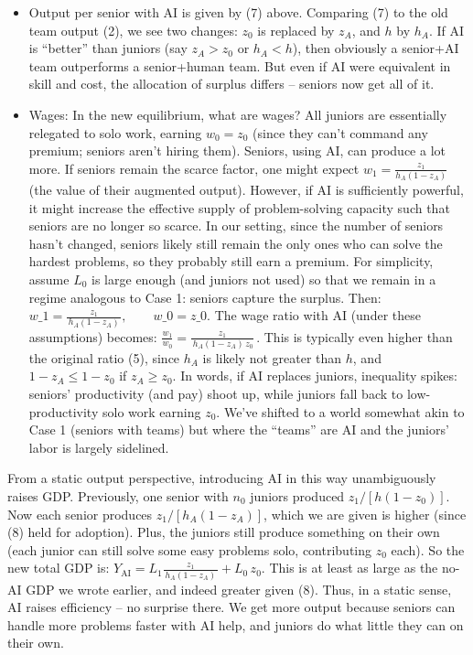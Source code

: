 \documentclass[12pt]{article}
\begin{document}
\begin{itemize}

\item
  {Output per senior with AI} is given by (7) above. Comparing
  (7) to the old team output (2), we see two changes: \(z_0\) is
  replaced by \(z_A\), and \(h\) by \(h_A\). If AI is ``better'' than
  juniors (say \(z_A > z_0\) or \(h_A < h\)), then obviously a senior+AI
  team outperforms a senior+human team. But even if AI were equivalent
  in skill and cost, the {allocation of surplus} differs -- seniors
  now get {all} of it.
\item
  {Wages:} In the new equilibrium, what are wages? All juniors
  are essentially relegated to solo work, earning \(w_0 = z_0\) (since
  they can't command any premium; seniors aren't hiring them). Seniors,
  using AI, can produce a lot more. If seniors remain the scarce factor,
  one might expect \(w_1 = \frac{z_1}{h_A(1-z_A)}\) (the value of their
  augmented output). However, if AI is sufficiently powerful, it might
  increase the {effective supply of problem-solving capacity} such
  that seniors are no longer so scarce. In our setting, since the number
  of seniors hasn't changed, seniors likely still remain the only ones
  who can solve the hardest problems, so they probably still earn a
  premium. For simplicity, assume \(L_0\) is large enough (and juniors
  not used) so that we remain in a regime analogous to Case 1: seniors
  capture the surplus. Then: $ w\_1 = \frac{z_1}{\,h_A(1-z_A)\,},
  \qquad w\_0 = z\_0.$ The {wage ratio with AI} (under these
  assumptions) becomes:
  \(\frac{w_1}{w_0} = \frac{z_1}{\,h_A (1-z_A) \, z_0}\,.\) This is
  typically {even higher} than the original ratio (5), since
  \(h_A\) is likely not greater than \(h\), and \(1-z_A \le 1-z_0\) if
  \(z_A \ge z_0\). In words, if AI replaces juniors, {inequality
  spikes}: seniors' productivity (and pay) shoot up, while juniors fall
  back to low-productivity solo work earning \(z_0\). We've shifted to a
  world somewhat akin to Case 1 (seniors with teams) but where the
  ``teams'' are AI and the juniors' labor is largely sidelined.
\end{itemize}

From a {static output} perspective, introducing AI in this way
unambiguously {raises GDP}. Previously, one senior with \(n_0\)
juniors produced \(z_1/[h(1-z_0)]\). Now each senior produces
\(z_1/[h_A(1-z_A)]\), which we are given is higher (since (8) held for
adoption). Plus, the juniors still produce something on their own (each
junior can still solve some easy problems solo, contributing \(z_0\)
each). So the new total GDP is:
\(Y_{\text{AI}} = L_1 \frac{z_1}{\,h_A(1-z_A)\,} + L_0 \, z_0.\) This is
{at least as large as} the no-AI GDP we wrote earlier, and indeed
greater given (8). Thus, in a static sense, AI raises efficiency -- no
surprise there. We get {more output} because seniors can handle
more problems faster with AI help, and juniors do what little they can
on their own.
\end{document}
